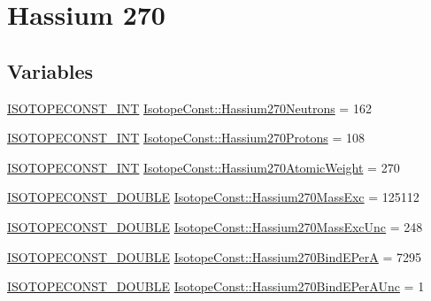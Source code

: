 \hypertarget{group___isotope_const-_hassium-_hs270}{}\section{Hassium 270}
\label{group___isotope_const-_hassium-_hs270}
\subsection*{Variables}
\begin{DoxyCompactItemize}
\item 
\mbox{\hyperlink{group___isotope_const-_macros_ga5f18360b3e99483a35c32d789e62621c}{I\+S\+O\+T\+O\+P\+E\+C\+O\+N\+S\+T\+\_\+\+I\+NT}} \mbox{\hyperlink{group___isotope_const-_hassium-_hs270_gaa378e5126aa4d5bd716717cbb2c2fb76}{Isotope\+Const\+::\+Hassium270\+Neutrons}} = 162
\item 
\mbox{\hyperlink{group___isotope_const-_macros_ga5f18360b3e99483a35c32d789e62621c}{I\+S\+O\+T\+O\+P\+E\+C\+O\+N\+S\+T\+\_\+\+I\+NT}} \mbox{\hyperlink{group___isotope_const-_hassium-_hs270_gaf85872a9ad83114e563472f8666872b0}{Isotope\+Const\+::\+Hassium270\+Protons}} = 108
\item 
\mbox{\hyperlink{group___isotope_const-_macros_ga5f18360b3e99483a35c32d789e62621c}{I\+S\+O\+T\+O\+P\+E\+C\+O\+N\+S\+T\+\_\+\+I\+NT}} \mbox{\hyperlink{group___isotope_const-_hassium-_hs270_ga130c504677cebed985b5454b25a57e8b}{Isotope\+Const\+::\+Hassium270\+Atomic\+Weight}} = 270
\item 
\mbox{\hyperlink{group___isotope_const-_macros_ga8f45a7272ce02c0b4c65c44636ed719a}{I\+S\+O\+T\+O\+P\+E\+C\+O\+N\+S\+T\+\_\+\+D\+O\+U\+B\+LE}} \mbox{\hyperlink{group___isotope_const-_hassium-_hs270_ga6fc826d84d78c19aa57cab4d7ab3a510}{Isotope\+Const\+::\+Hassium270\+Mass\+Exc}} = 125112
\item 
\mbox{\hyperlink{group___isotope_const-_macros_ga8f45a7272ce02c0b4c65c44636ed719a}{I\+S\+O\+T\+O\+P\+E\+C\+O\+N\+S\+T\+\_\+\+D\+O\+U\+B\+LE}} \mbox{\hyperlink{group___isotope_const-_hassium-_hs270_gaabd6dd4aaa0272db3251f9b403873255}{Isotope\+Const\+::\+Hassium270\+Mass\+Exc\+Unc}} = 248
\item 
\mbox{\hyperlink{group___isotope_const-_macros_ga8f45a7272ce02c0b4c65c44636ed719a}{I\+S\+O\+T\+O\+P\+E\+C\+O\+N\+S\+T\+\_\+\+D\+O\+U\+B\+LE}} \mbox{\hyperlink{group___isotope_const-_hassium-_hs270_gafdb6c0d672281a786fe5b87c5fd9fd6c}{Isotope\+Const\+::\+Hassium270\+Bind\+E\+PerA}} = 7295
\item 
\mbox{\hyperlink{group___isotope_const-_macros_ga8f45a7272ce02c0b4c65c44636ed719a}{I\+S\+O\+T\+O\+P\+E\+C\+O\+N\+S\+T\+\_\+\+D\+O\+U\+B\+LE}} \mbox{\hyperlink{group___isotope_const-_hassium-_hs270_ga11204e2a9bd6c60ccccf78bfaf384ca6}{Isotope\+Const\+::\+Hassium270\+Bind\+E\+Per\+A\+Unc}} = 1

\end{DoxyCompactItemize}
